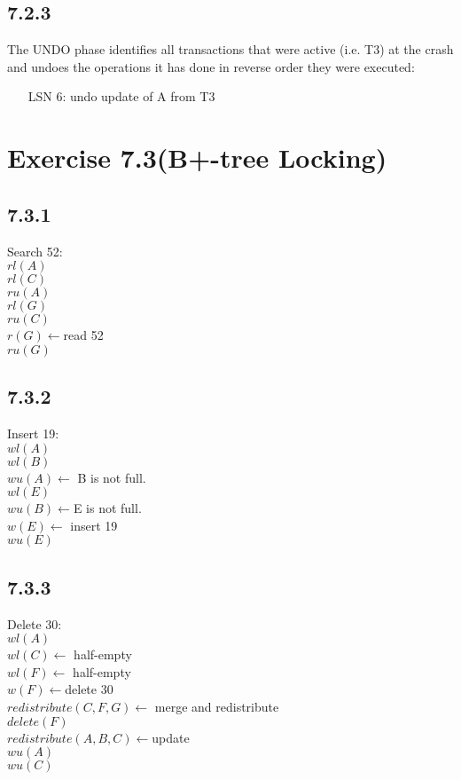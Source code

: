 \documentclass[12pt]{article}
\begin{document}
	\subsection*{7.2.3}
		The UNDO phase identifies all transactions that were active (i.e. T3) at the crash and undoes the operations it has done in reverse order they were executed:
		\begin{itemize}
			\setlength{\itemindent}{1cm}
			\item[LSN 6:] undo update of A from T3
		\end{itemize}	
		
	\section*{Exercise 7.3(B+-tree Locking)}
	\subsection*{7.3.1}
	Search 52:\\
	$rl(A)$\\
	$rl(C)$\\
	$ru(A)$\\
	$rl(G)$\\
	$ru(C)$\\
	$r(G)\leftarrow $read 52 \\
	$ru(G)$\\
	\subsection*{7.3.2}
	Insert 19:\\
	$wl(A)$\\
	$wl(B)$\\
	$wu(A)\leftarrow$ B is not full.\\
	$wl(E)$\\
	$wu(B)\leftarrow $E is not full.\\
	$w(E)\leftarrow$ insert 19\\
	$wu(E)$\\
	
	\subsection*{7.3.3}
	Delete 30:\\
	$wl(A)$\\
	$wl(C)\leftarrow$ half-empty\\
	$wl(F)\leftarrow$ half-empty\\
	$w(F)\leftarrow$delete 30\\
	$redistribute(C,F,G)\leftarrow$ merge and redistribute\\
	$delete(F)$\\
	$redistribute(A,B,C)\leftarrow$update\\
	$wu(A)$\\
	$wu(C)$\\
	
\end{document}
